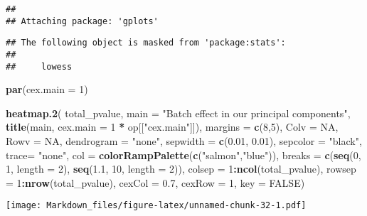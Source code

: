 \documentclass[]{article}
\newenvironment{Shaded}{\begin{snugshade}}{\end{snugshade}}
\newcommand{\KeywordTok}[1]{\textcolor[rgb]{0.13,0.29,0.53}{\textbf{#1}}}
\newcommand{\DataTypeTok}[1]{\textcolor[rgb]{0.13,0.29,0.53}{#1}}
\newcommand{\DecValTok}[1]{\textcolor[rgb]{0.00,0.00,0.81}{#1}}
\newcommand{\FloatTok}[1]{\textcolor[rgb]{0.00,0.00,0.81}{#1}}
\newcommand{\StringTok}[1]{\textcolor[rgb]{0.31,0.60,0.02}{#1}}
\newcommand{\OtherTok}[1]{\textcolor[rgb]{0.56,0.35,0.01}{#1}}
\newcommand{\OperatorTok}[1]{\textcolor[rgb]{0.81,0.36,0.00}{\textbf{#1}}}
\newcommand{\NormalTok}[1]{#1}
\begin{document}
\begin{verbatim}
## 
## Attaching package: 'gplots'
\end{verbatim}

\begin{verbatim}
## The following object is masked from 'package:stats':
## 
##     lowess
\end{verbatim}

\begin{Shaded}
\begin{Highlighting}[]
\KeywordTok{par}\NormalTok{(}\DataTypeTok{cex.main =} \DecValTok{1}\NormalTok{)}
    
    \KeywordTok{heatmap.2}\NormalTok{(}
\NormalTok{      total_pvalue, }\DataTypeTok{main =} \StringTok{"Batch effect in our principal components"}\NormalTok{,}
      \KeywordTok{title}\NormalTok{(main, }\DataTypeTok{cex.main =} \DecValTok{1} \OperatorTok{*}\StringTok{ }\NormalTok{op[[}\StringTok{"cex.main"}\NormalTok{]]),}
      \DataTypeTok{margins =} \KeywordTok{c}\NormalTok{(}\DecValTok{8}\NormalTok{,}\DecValTok{5}\NormalTok{),}
      \DataTypeTok{Colv =} \OtherTok{NA}\NormalTok{, }
      \DataTypeTok{Rowv =} \OtherTok{NA}\NormalTok{,}
      \DataTypeTok{dendrogram =} \StringTok{"none"}\NormalTok{, }
      \DataTypeTok{sepwidth =} \KeywordTok{c}\NormalTok{(}\FloatTok{0.01}\NormalTok{, }\FloatTok{0.01}\NormalTok{), }
      \DataTypeTok{sepcolor =} \StringTok{"black"}\NormalTok{, }
      \DataTypeTok{trace=} \StringTok{"none"}\NormalTok{, }
      \DataTypeTok{col =} \KeywordTok{colorRampPalette}\NormalTok{(}\KeywordTok{c}\NormalTok{(}\StringTok{"salmon"}\NormalTok{,}\StringTok{"blue"}\NormalTok{)), }
      \DataTypeTok{breaks =} \KeywordTok{c}\NormalTok{(}\KeywordTok{seq}\NormalTok{(}\DecValTok{0}\NormalTok{, }\DecValTok{1}\NormalTok{, }\DataTypeTok{length =} \DecValTok{2}\NormalTok{),}
                 \KeywordTok{seq}\NormalTok{(}\FloatTok{1.1}\NormalTok{, }\DecValTok{10}\NormalTok{, }\DataTypeTok{length =} \DecValTok{2}\NormalTok{)),}
      \DataTypeTok{colsep =} \DecValTok{1}\OperatorTok{:}\KeywordTok{ncol}\NormalTok{(total_pvalue), }
      \DataTypeTok{rowsep =} \DecValTok{1}\OperatorTok{:}\KeywordTok{nrow}\NormalTok{(total_pvalue), }
      \DataTypeTok{cexCol =} \FloatTok{0.7}\NormalTok{,}
      \DataTypeTok{cexRow =} \DecValTok{1}\NormalTok{,}
      \DataTypeTok{key =} \OtherTok{FALSE}\NormalTok{)}
\end{Highlighting}
\end{Shaded}

\texttt{[image: Markdown\_files/figure-latex/unnamed-chunk-32-1.pdf]}
\end{document}
